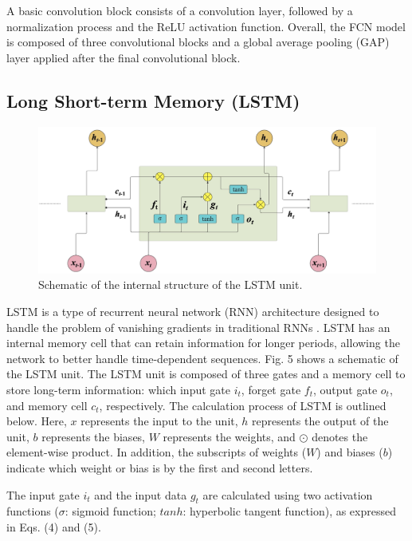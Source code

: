 \documentclass{ieeeaccess}
\begin{document}
A basic convolution block consists of a convolution layer, followed by a normalization process and the ReLU activation function. Overall, the FCN model is composed of three convolutional blocks and a global average pooling (GAP) layer \cite{Lin_2013} applied after the final convolutional block.

\subsection{Long Short-term Memory (LSTM)}

\begin{figure}[h]
    \includegraphics*[width=\linewidth]{LSTM.jpg}
    \caption{Schematic of the internal structure of the LSTM unit.}
    \label{figure}
\end{figure}

LSTM is a type of recurrent neural network (RNN) architecture designed to handle the problem of vanishing gradients in traditional RNNs \cite{Hochreiter_1997}. LSTM has an internal memory cell that can retain information for longer periods, allowing the network to better handle time-dependent sequences. Fig. 5 shows a schematic of the LSTM unit. The LSTM unit is composed of three gates and a memory cell to store long-term information: which input gate $i_t$, forget gate $f_t$, output gate $o_t$, and memory cell $c_t$, respectively. The calculation process of LSTM is outlined below. Here, $x$ represents the input to the unit, $h$ represents the output of the unit, $b$ represents the biases, $W$ represents the weights, and $\odot$ denotes the element-wise product. In addition, the subscripts of weights ($W$) and biases ($b$) indicate which weight or bias is by the first and second letters.

The input gate $i_t$ and the input data $g_t$ are calculated using two activation functions ($\sigma$: sigmoid function; $tanh$: hyperbolic tangent function), as expressed in Eqs. (4) and (5). 
\end{document}
